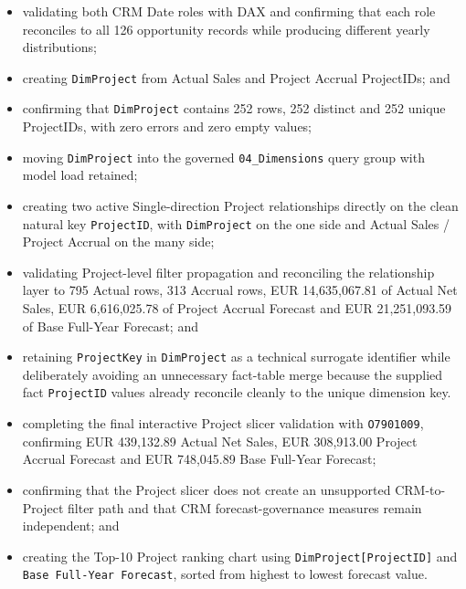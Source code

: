 \documentclass[11pt,a4paper]{article}
\begin{document}
\begin{itemize}[leftmargin=7mm,itemsep=3pt]
    one inactive role-playing relationship on \texttt{SimulatedProgramStartDate},
    both using Single cross-filter direction;
    \item validating both CRM Date roles with DAX and confirming that each role
    reconciles to all 126 opportunity records while producing different yearly
    distributions;
    \item creating \texttt{DimProject} from Actual Sales and Project Accrual
    ProjectIDs; and
    \item confirming that \texttt{DimProject} contains 252 rows, 252 distinct and
    252 unique ProjectIDs, with zero errors and zero empty values;
    \item moving \texttt{DimProject} into the governed \texttt{04\_Dimensions}
    query group with model load retained;
    \item creating two active Single-direction Project relationships directly on
    the clean natural key \texttt{ProjectID}, with \texttt{DimProject} on the one side
    and Actual Sales / Project Accrual on the many side;
    \item validating Project-level filter propagation and reconciling the relationship
    layer to 795 Actual rows, 313 Accrual rows, EUR 14,635,067.81 of Actual Net Sales,
    EUR 6,616,025.78 of Project Accrual Forecast and EUR 21,251,093.59 of Base
    Full-Year Forecast; and
    \item retaining \texttt{ProjectKey} in \texttt{DimProject} as a technical surrogate
    identifier while deliberately avoiding an unnecessary fact-table merge because
    the supplied fact \texttt{ProjectID} values already reconcile cleanly to the unique
    dimension key.
    \item completing the final interactive Project slicer validation with
    \texttt{O7901009}, confirming EUR 439,132.89 Actual Net Sales,
    EUR 308,913.00 Project Accrual Forecast and EUR 748,045.89 Base Full-Year Forecast;
    \item confirming that the Project slicer does not create an unsupported CRM-to-Project
    filter path and that CRM forecast-governance measures remain independent; and
    \item creating the Top-10 Project ranking chart using \texttt{DimProject[ProjectID]}
    and \texttt{Base Full-Year Forecast}, sorted from highest to lowest forecast value.


\end{itemize}
\end{document}
